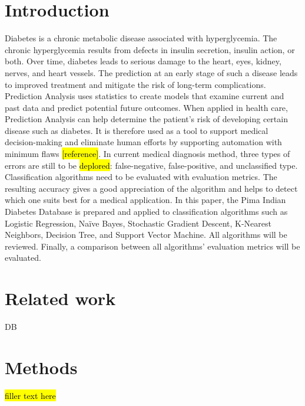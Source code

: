 \documentclass[11pt]{article}
\begin{document}
	\section{Introduction}
	Diabetes is a chronic metabolic disease associated with hyperglycemia. The chronic hyperglycemia results from defects in insulin secretion, insulin action, or both. Over time, diabetes leads to serious damage to the heart, eyes, kidney, nerves, and heart vessels. The prediction at an early stage of such a disease leads to improved treatment and mitigate the risk of long-term complications. Prediction Analysis uses statistics to create models that examine current and past data and predict potential future outcomes. When applied in health care, Prediction Analysis can help determine the patient’s risk of developing certain disease such as diabetes. It is therefore used as a tool to support medical decision-making and eliminate human efforts by supporting automation with minimum flaws \hl{[reference]}. In current medical diagnosis method, three types of errors are still to be \hl{deplored}: false-negative, false-positive, and unclassified type.	
	\bigbreak
	Classification algorithms need to be evaluated with evaluation metrics. The resulting accuracy gives a good appreciation of the algorithm and helps to detect which one suits best for a medical application. In this paper, the Pima Indian Diabetes Database \cite{Pima} is prepared and applied to classification algorithms such as Logistic Regression, Naïve Bayes, Stochastic Gradient Descent, K-Nearest Neighbors, Decision Tree, and Support Vector Machine. All algorithms will be reviewed. Finally, a comparison between all algorithms’ evaluation metrics will be evaluated.
	
	\section{Related work}
	\cite{MUJUMDAR2019292}
	DB
	\section{Methods}
	\hl{filler text here}
\end{document}
